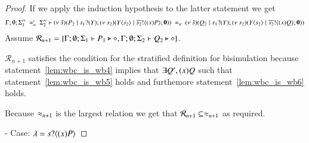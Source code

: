 \begin{proof}
	\noi If we apply the induction hypothesis to the latter statement we get
%
	\begin{eqnarray}
		\Gamma; \emptyset; \Sigma_1''\ \wbc_{n}\ \Sigma_2'' \proves \newsp{\tilde{s}}{P_2 \Par \binp{s_1}{Y} \newsp{s_2}{\appl{Y}{s_2} \Par \bout{\dual{s_2}}{\abs{x}{P}}  \inact}}
		\ \wb_{n}\ 
		\newsp{\tilde{s}}{Q_2 \Par \binp{s_1}{Y} \newsp{s_2}{\appl{Y}{s_2} \Par \bout{\dual{s_2}}{\abs{x}{Q}}  \inact}}
		\label{lem:wbc_is_wb6}
	\end{eqnarray}
%
%
	\noi Assume $\mathcal{R}_{n+1} = \{\Gamma; \emptyset; \Sigma_1 \vdash P_1 \triangleright \diamond, \Gamma; \emptyset; \Sigma_2 \vdash Q_2 \triangleright \diamond\}$.

	\noi $\mathcal{R}_{n+1}$ satisfies the condition for the stratified definition for bisimulation
	because statement~\ref{lem:wbc_is_wb4} implies that
	$\exists Q', (x)Q$ such that
	statement~\ref{lem:wbc_is_wb5} holds and furthemore statement~\ref{lem:wbc_is_wb6} holds.

	\noi Because $\approx_{n+1}$ is the largest relation we get that $\mathcal{R}_{n+1} \subseteq \approx_{n+1}$ as required.


	\noi - Case: $\lambda = s ? \langle (x)P \rangle$


\end{proof}
